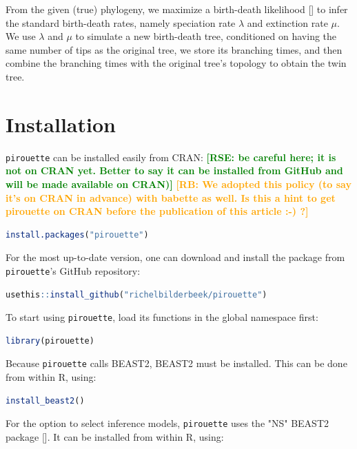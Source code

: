\documentclass{article}
\newcommand{\richel}[1]{\textcolor{orange}{\textbf{[RB: #1]}}}
\newcommand{\rampal}[1]{\textcolor{green}{\textbf{[RSE: #1]}}}
\begin{document}
From the given (true) phylogeny, we maximize a birth-death 
likelihood [\cite{nee1994reconstructed}] to infer the standard 
birth-death rates, namely speciation rate $\lambda$ and extinction rate $\mu$.
We use $\lambda$ and $\mu$ to simulate a new birth-death tree, 
conditioned on having the same number of tips as the original tree, we store its branching times, and then  combine the branching times with the original tree's 
topology to obtain the twin tree.

\section{Installation}

\verb;pirouette; can be installed easily from CRAN:
\rampal{be careful here; it is not on CRAN yet. Better to say it can be installed from GitHub and will be made available on CRAN)}
\richel{We adopted this policy (to say it's on CRAN in advance) with babette as well. Is this a hint to get pirouette on CRAN before the publication of this article :-) ?}
\begin{lstlisting}[language=R, floatplacement=H, frame=single]
install.packages("pirouette")
\end{lstlisting}

For the most up-to-date version, 
one can download and install the package from \verb;pirouette;'s GitHub repository:

\begin{lstlisting}[language=R, floatplacement=H, frame=single]
usethis::install_github("richelbilderbeek/pirouette")
\end{lstlisting}

To start using \verb;pirouette;, load its functions in the global namespace first:

\begin{lstlisting}[language=R, floatplacement=H, frame=single]
library(pirouette)
\end{lstlisting}
Because \verb;pirouette; calls BEAST2, BEAST2 must be installed. 
This can be done from within R, using:

\begin{lstlisting}[language=R, floatplacement=H, frame=single]
install_beast2()
\end{lstlisting}
For the option to select inference models,
\verb;pirouette; uses the "NS" BEAST2 package [\cite{maturana2018model}].
It can be installed from within R, using:
\end{document}
